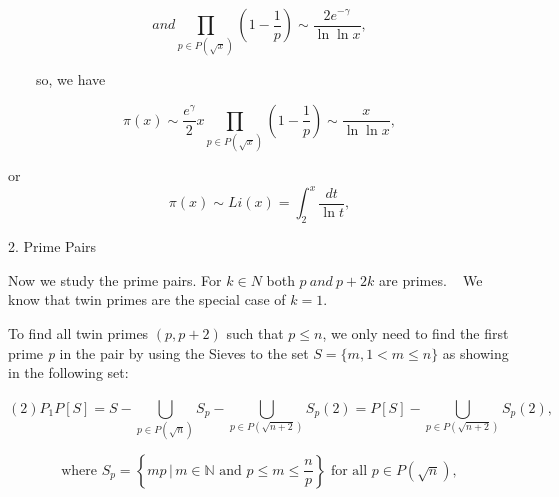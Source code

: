\documentclass{article}
\begin{document}
\begin{equation}
  and          \prod_{p\in P\left(\sqrt{x}\right)}^{}(1-\frac{1}{p} ) \sim  \frac{2e^{-\gamma }}{\ln \ln  x }  ,
\end{equation}

\vspace{1\baselineskip}

\ \ \ \ so, we have

\begin{equation}
\pi\left(x\right) \sim  \frac{e^{\gamma }}{2}  x\prod_{p\in P\left(\sqrt{x}\right)}^{}\left(1-\frac{1}{p}\right) \sim  \frac{x}{\ln \ln  x }   ,
\end{equation}
\vspace{1\baselineskip}

 or 
\begin{equation}
\pi(x) \sim Li(x) = \int_{2}^{x} \frac{dt}{\ln t},
\end{equation}


\vspace{1\baselineskip}
\begin{center}
\begin{enumerate}
2. Prime Pairs
\end{enumerate}
\end{center}

Now we study the prime pairs.
\vspace{1\baselineskip}
For \( k\in N\) both \( p \ and \ p+2k\) are primes.\textbf{\ \ }We know that twin primes are the special case of \( k = 1\).
\vspace{1\baselineskip}

 To find all twin primes \( (p,  p+2)\) such that \( p\leq n\), we only need to find the first prime \textit{p} in the pair by using  {the Sieves to the set }\( S = \{ m,  1<m\leq n\}\) as showing in the following  {set}:

\begin{equation}
\left(2\right)                  P_{1}P\left[S\right] =  S- \bigcup_{p\in P\left(\sqrt{n}\right)}^{} S_{p} - \bigcup_{p\in P\left(\sqrt{n+2}\right)}^{}S_{p}\left(2\right) =  P\left[S\right]-\bigcup_{p\in P\left(\sqrt{n+2}\right)}^{}S_{p}\left(2\right) ,
\end{equation}

\begin{equation}
\text{where } S_{p} = \left\{ mp \, | \, m \in \mathbb{N} \text{ and } p \leq m \leq \frac{n}{p} \right\} \text{ for all } p \in P(\sqrt{n}),
\end{equation}
\end{document}
